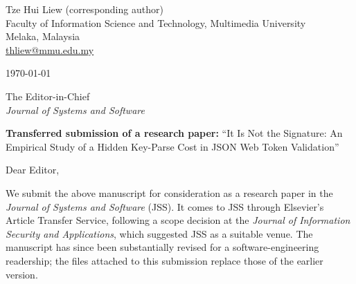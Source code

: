 \documentclass[11pt,a4paper]{article}
\begin{document}
\noindent
Tze Hui Liew (corresponding author)\\
Faculty of Information Science and Technology, Multimedia University\\
Melaka, Malaysia\\
\href{mailto:thliew@mmu.edu.my}{thliew@mmu.edu.my}

\medskip
\noindent\today

\medskip
\noindent
The Editor-in-Chief\\
\emph{Journal of Systems and Software}

\medskip
\noindent
\textbf{Transferred submission of a research paper:} ``It Is Not the Signature: An
Empirical Study of a Hidden Key-Parse Cost in JSON Web Token Validation''

Dear Editor,

We submit the above manuscript for consideration as a research paper in the
\emph{Journal of Systems and Software} (JSS). It comes to JSS through
Elsevier's Article Transfer Service, following a scope decision at the
\emph{Journal of Information Security and Applications}, which suggested JSS
as a suitable venue. The manuscript has since been substantially revised for a
software-engineering readership; the files attached to this submission replace
those of the earlier version.
\end{document}
